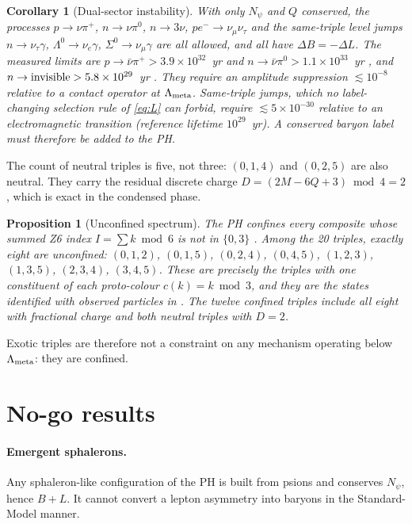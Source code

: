\documentclass[11pt]{article}
\newtheorem{proposition}[theorem]{Proposition}
\newtheorem{corollary}[theorem]{Corollary}
\newcommand{\Lm}{\Lambda_{\rm meta}}
\newcommand{\Np}{N_\psi}
\begin{document}
\begin{corollary}[Dual-sector instability]\label{co:dual}
With only $\Np$ and $Q$ conserved, the processes $p\to\nu\pi^+$, $n\to\nu\pi^0$, $n\to3\nu$, $pe^-\to\nu_\mu\nu_\tau$ and the same-triple level jumps $n\to\nu_\tau\gamma$, $\Lambda^0\to\nu_e\gamma$, $\Sigma^0\to\nu_\mu\gamma$ are all allowed, and all have $\Delta B=-\Delta L$. The measured limits are $p\to\bar\nu\pi^+>3.9\times10^{32}$~yr and $n\to\bar\nu\pi^0>1.1\times10^{33}$~yr \cite{sk}, and $n\to{\rm invisible}>5.8\times10^{29}$~yr \cite{kamland}. They require an amplitude suppression $\lesssim10^{-8}$ relative to a contact operator at $\Lm$. Same-triple jumps, which no label-changing selection rule of \eqref{eq:L} can forbid, require $\lesssim5\times10^{-30}$ relative to an electromagnetic transition (reference lifetime $10^{29}$~yr). A conserved baryon label must therefore be added to the PH.
\end{corollary}

\noindent The count of neutral triples is five, not three: $(0,1,4)$ and $(0,2,5)$ are also neutral. They carry the residual discrete charge $D=(2M-6Q+3)\bmod4=2$, which is exact in the condensed phase.

\begin{proposition}[Unconfined spectrum]\label{pr:conf}
The PH confines every composite whose summed Z6 index $I=\sum k \bmod 6$ is not in $\{0,3\}$ \cite{phf}. Among the 20 triples, exactly eight are unconfined: $(0,1,2)$, $(0,1,5)$, $(0,2,4)$, $(0,4,5)$, $(1,2,3)$, $(1,3,5)$, $(2,3,4)$, $(3,4,5)$. These are precisely the triples with one constituent of each proto-colour $c(k)=k\bmod3$, and they are the states identified with observed particles in \cite{phf}. The twelve confined triples include all eight with fractional charge and both neutral triples with $D=2$.
\end{proposition}
\noindent Exotic triples are therefore not a constraint on any mechanism operating below $\Lm$: they are confined.

\section{No-go results}\label{sec:nogo}

\paragraph{Emergent sphalerons.} Any sphaleron-like configuration of the PH is built from psions and conserves $\Np$, hence $B+L$. It cannot convert a lepton asymmetry into baryons in the Standard-Model manner.
\end{document}

